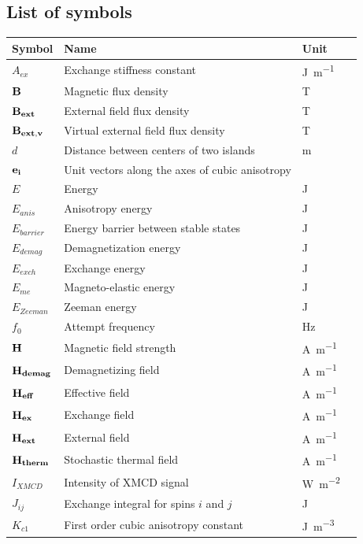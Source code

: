 \documentclass[11pt,a4paper,english]{article}
\begin{document}
\subsection*{List of symbols}
\begin{longtable}{llll}
\toprule
\bfseries Symbol & \bfseries Name &
\bfseries Unit \\\midrule\endhead
$A_{ex}$ & Exchange stiffness constant & \si{\joule\per\metre} \\
$\vb{B}$ & Magnetic flux density & \si{\tesla} \\
$\vb{B_{ext}}$ & External field flux density & \si{\tesla} \\
$\vb{B_{ext,v}}$ & Virtual external field flux density & \si{\tesla} \\
$d$ & Distance between centers of two islands & \si{\metre} \\
$\vb{e_i}$ & Unit vectors along the axes of cubic anisotropy &  \\
$E$ & Energy & \si{\joule} \\
$E_{anis}$ & Anisotropy energy & \si{\joule} \\
$E_{barrier}$ & Energy barrier between stable states & \si{\joule} \\
$E_{demag}$ & Demagnetization energy & \si{\joule} \\
$E_{exch}$ & Exchange energy & \si{\joule} \\
$E_{me}$ & Magneto-elastic energy & \si{\joule} \\
$E_{Zeeman}$ & Zeeman energy & \si{\joule} \\
$f_0$ & Attempt frequency & \si{\hertz} \\
$\vb{H}$ & Magnetic field strength & \si{\ampere\per\metre} \\
$\vb{H_{demag}}$ & Demagnetizing field & \si{\ampere\per\metre} \\
$\vb{H_{eff}}$ & Effective field & \si{\ampere\per\metre} \\
$\vb{H_{ex}}$ & Exchange field & \si{\ampere\per\metre} \\
$\vb{H_{ext}}$ & External field & \si{\ampere\per\metre} \\
$\vb{H_{therm}}$ & Stochastic thermal field & \si{\ampere\per\metre} \\
$I_{XMCD}$ & Intensity of XMCD signal & \si{\watt\per\metre\squared} \\
$J_{ij}$ & Exchange integral for spins $i$ and $j$ & \si{\joule} \\
$K_{c1}$ & First order cubic anisotropy constant & \si{\joule\per\metre\cubed} \\

\end{longtable}
\end{document}
